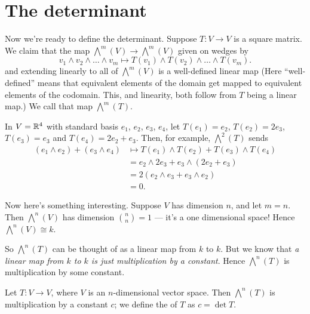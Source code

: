 \section{The determinant}

Now we're ready to define the determinant.
Suppose $T \colon V \to V$ is a square matrix.
We claim that the map $\bigwedge^m(V) \to \bigwedge^m(V)$ given on wedges by
\[ v_1 \wedge v_2 \wedge \dots \wedge v_m
	\mapsto T(v_1) \wedge T(v_2) \wedge \dots \wedge T(v_m). \]
and extending linearly to all of $\bigwedge^m(V)$ is a
well-defined  linear map
(Here ``well-defined'' means that equivalent elements of the domain
get mapped to equivalent elements of the codomain.
This, and linearity, both follow from $T$ being a linear map.)
We call that map $\bigwedge^m(T)$.
\begin{example}
	In $V = \mathbb R^4$ with standard basis $e_1$, $e_2$, $e_3$, $e_4$,
	let $T(e_1) = e_2$, $T(e_2) = 2e_3$, $T(e_3) = e_3$ and $T(e_4) = 2e_2 + e_3$.
	Then, for example, $\bigwedge^2(T)$ sends
	\begin{align*}
		(e_1 \wedge e_2) + (e_3 \wedge e_4)
		&\mapsto T(e_1) \wedge T(e_2) + T(e_3) \wedge T(e_4) \\
		&= e_2 \wedge 2e_3 + e_3 \wedge (2e_2 + e_3) \\
		&= 2(e_2 \wedge e_3 + e_3 \wedge e_2) \\
		&= 0.
	\end{align*}
\end{example}

Now here's something interesting.
Suppose $V$ has dimension $n$, and let $m=n$.
Then $\bigwedge^n(V)$ has dimension $\binom nn = 1$ --- it's a one dimensional space!
Hence $\bigwedge^n(V) \cong k$.

So $\bigwedge^n(T)$ can be thought of as a linear map from $k$ to $k$.
But we know that \emph{a linear map from $k$ to $k$ is just multiplication by a constant}.
Hence $\bigwedge^n(T)$ is multiplication by some constant.
\begin{definition}
	\label{def:det}
	Let $T \colon V \to V$, where $V$ is an $n$-dimensional vector space.
	Then $\bigwedge^n(T)$ is multiplication by a constant $c$;
	we define the  of $T$ as $c = \det T$.
\end{definition}

